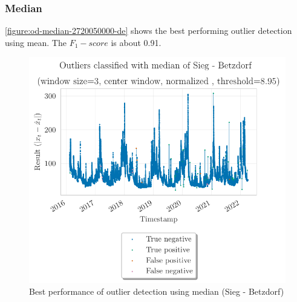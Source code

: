 \subsubsection{Median}
\autoref{figure:od-median-2720050000-de} shows the best performing outlier detection using mean. The $F_1-score$ is about 0.91. %
\begin{figure}[htp]
    \centering 
    \includegraphics{plots/pdfs/2720050000-de/od_median_2720050000-de_all.pdf}
    \caption{Best performance of outlier detection using median (Sieg - Betzdorf)}
    \label{figure:od-median-2720050000-de}
\end{figure}
